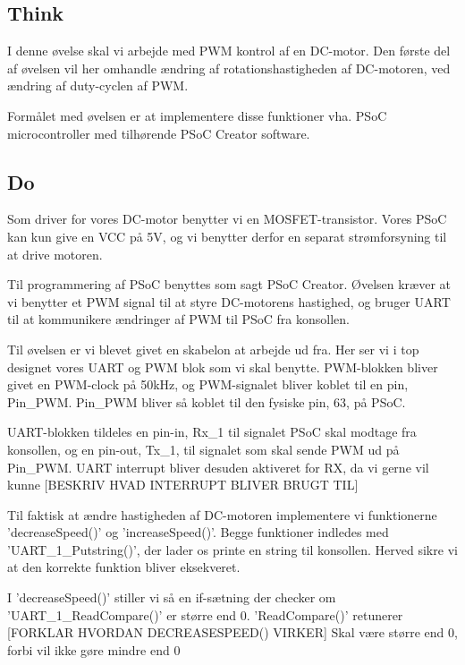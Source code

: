 \documentclass[../main.tex]{subfiles}
\begin{document}
\subsection{Think}
I denne øvelse skal vi arbejde med PWM kontrol af en DC-motor. Den første del af øvelsen vil her omhandle ændring af rotationshastigheden af DC-motoren, ved ændring af duty-cyclen af PWM.

Formålet med øvelsen er at implementere disse funktioner vha. PSoC microcontroller med tilhørende PSoC Creator software. 

\subsection{Do}
Som driver for vores DC-motor benytter vi en MOSFET-transistor. Vores PSoC kan kun give en VCC på 5V, og vi benytter derfor en separat strømforsyning til at drive motoren.

Til programmering af PSoC benyttes som sagt PSoC Creator. Øvelsen kræver at vi benytter et PWM signal til at styre DC-motorens hastighed, og bruger UART til at kommunikere ændringer af PWM til PSoC fra konsollen.

Til øvelsen er vi blevet givet en skabelon at arbejde ud fra. Her ser vi i top designet vores UART og PWM blok som vi skal benytte. PWM-blokken bliver givet en PWM-clock på 50kHz, og PWM-signalet bliver koblet til en pin, Pin\_PWM. Pin\_PWM bliver så koblet til den fysiske pin, 63, på PSoC.


UART-blokken tildeles en pin-in, Rx\_1 til signalet PSoC skal modtage fra konsollen, og en pin-out, Tx\_1, til signalet som skal sende PWM ud på Pin\_PWM. UART interrupt bliver desuden aktiveret for RX, da vi gerne vil kunne [BESKRIV HVAD INTERRUPT BLIVER BRUGT TIL]

Til faktisk at ændre hastigheden af DC-motoren implementere vi funktionerne ’decreaseSpeed()’ og ’increaseSpeed()’. Begge funktioner indledes med ’UART\_1\_Putstring()’, der lader os printe en string til konsollen. Herved sikre vi at den korrekte funktion bliver eksekveret. 


I ’decreaseSpeed()’ stiller vi så en if-sætning der checker om ’UART\_1\_ReadCompare()’ er større end 0. ’ReadCompare()’ retunerer [FORKLAR HVORDAN DECREASESPEED() VIRKER]
Skal være større end 0, forbi vil ikke gøre mindre end 0
\end{document}
